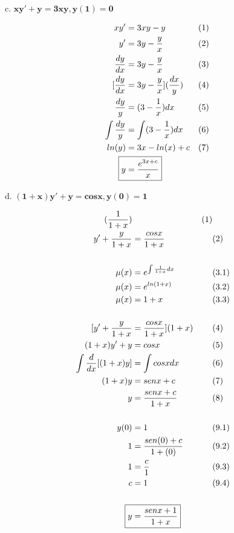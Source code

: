 \documentclass{article}
\newcommand{\newLine}[3]{ #1 & = #2 && \text{(#3)}\\ }
\newcommand{\finalAnswer}[2]{ \Aboxed{ #1 & = #2 } }
\begin{document}
\begin{flushleft}
        \hspace{10mm} c. $
            \boldsymbol{ xy' + y = 3xy , y(1) = 0}
            $  \break

            \begin{align*}
                xy' & = 3xy - y  && \text{(1)}\\
                y' & = 3y - \frac{y}{x}  && \text{(2)}\\
                \frac{dy}{dx} & = 3y - \frac{y}{x}  && \text{(3)}\\
                [ \frac{dy}{dx} & = 3y - \frac{y}{x} ] (\frac{dx}{y})  && \text{(4)}\\
                \frac{dy}{y} & = (3 - \frac{1}{x})dx  && \text{(5)}\\
                \int \frac{dy}{y} & = \int (3 - \frac{1}{x})dx  && \text{(6)}\\
                ln(y) & = 3x - ln(x) + c  && \text{(7)}\\
                \Aboxed{y & = \frac{e^{3x + c}}{x}}\\
            \end{align*}

        \hspace{10mm} d. $
            \boldsymbol{ (1+x)y' + y = cosx , y(0) = 1}
            $  \break

            \begin{align*}
                [ (1+x)y' + y & = cosx ] (\frac{1}{1+x}) && \text{(1)}\\
                y' + \frac{y}{1+x} & = \frac{cosx}{1+x} && \text{(2)}\\
                \\
                \mu(x) & = e^{\int \frac{1}{1+x} dx} && \text{(3.1)}\\
                \mu(x) & = e^{ln(1+x)} && \text{(3.2)}\\
                \mu(x) & = 1+x && \text{(3.3)}\\
                \\
                [ y' + \frac{y}{1+x} & = \frac{cosx}{1+x} ] (1+x) && \text{(4)}\\
                (1+x)y' + y & = cosx && \text{(5)}\\
                \int \frac{d}{dx} [ (1+x)y ] & = \int cosx dx && \text{(6)}\\
                \newLine{(1+x)y}{senx + c}{7}
                \newLine{y}{\frac{senx + c}{1+x}}{8}
                \\
                \newLine{y(0)}{1}{9.1}
                \newLine{1}{ \frac{sen(0) + c}{1+(0)} }{9.2}
                \newLine{1}{ \frac{c}{1} }{9.3}
                \newLine{c}{1}{9.4}
                \\
                \finalAnswer{y}{\frac{senx + 1}{1+x}}
            \end{align*}


\end{flushleft}
\end{document}
